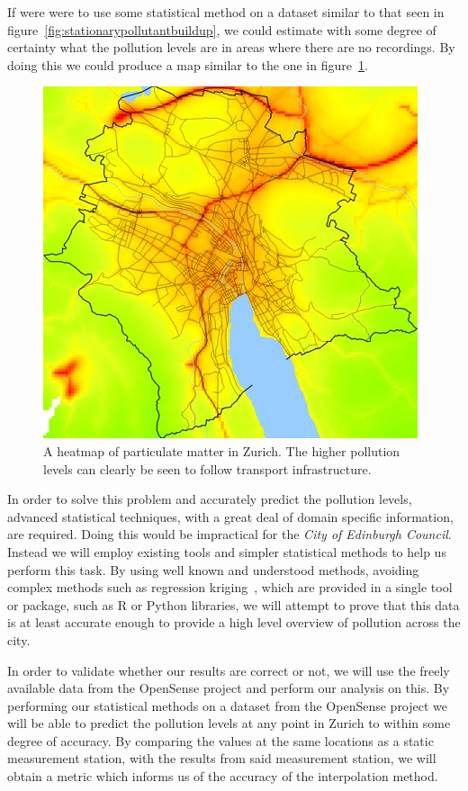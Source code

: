 	If were were to use some statistical method on a dataset similar to that seen in figure~\ref{fig:stationarypollutantbuildup}, we could estimate with some degree of certainty what the pollution levels are in areas where there are no recordings. By doing this we could produce a map similar to the one in figure~\ref{fig:zurichheatmap}.

	\begin{figure}[H]
	    \begin{center}
	        \includegraphics[width=\textwidth]{./images/zurichpm.jpg}
	        \caption{A heatmap of particulate matter in Zurich. The higher pollution levels can clearly be seen to follow transport infrastructure.~\cite{opensensezurich}}
	        \label{fig:zurichheatmap}
	    \end{center}
	\end{figure}

	
	In order to solve this problem and accurately predict the pollution levels, advanced statistical techniques, with a great deal of domain specific information, are required. Doing this would be impractical for the \emph{City of Edinburgh Council}. Instead we will employ existing tools and simpler statistical methods to help us perform this task. By using well known and understood methods, avoiding complex methods such as regression kriging~\cite{regressionkriging}, which are provided in a single tool or package, such as R or Python libraries, we will attempt to prove that this data is at least accurate enough to provide a high level overview of pollution across the city. 

	In order to validate whether our results are correct or not, we will use the freely available data from the OpenSense project and perform our analysis on this. By performing our statistical methods on a dataset from the OpenSense project we will be able to predict the pollution levels at any point in Zurich to within some degree of accuracy. By comparing the values at the same locations as a static measurement station, with the results from said measurement station, we will obtain a metric which informs us of the accuracy of the interpolation method.


